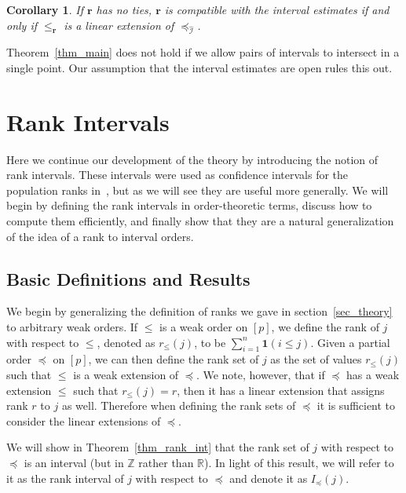\documentclass[12pt]{article}
\newcommand{\ind}[1]{\mathbf{1}(#1)}
\newcommand{\iord}{{\preceq_{\hat{\mathcal{I}}}}}
\newcommand{\rord}[1][\mathbf{r}]{{\leqslant_{#1}}}
\numberwithin{theorem}{section}
\newtheorem{corollary}[theorem]{Corollary}
\begin{document}
\begin{corollary}
\label{cor_main}
If $\mathbf{r}$ has no ties, $\mathbf{r}$ is compatible with the interval estimates if and only if $\rord$ is a linear extension of $\iord$.
\end{corollary}

Theorem~\ref{thm_main} does not hold if we allow pairs of intervals to intersect in a single point.  Our assumption that the interval estimates are open rules this out.

\section{Rank Intervals}
\label{sec_rank_int}

Here we continue our development of the theory by introducing the notion of rank intervals.  These intervals were used as confidence intervals for the population ranks in~\cite{klein2020jointCR}, but as we will see they are useful more generally.  We will begin by defining the rank intervals in order-theoretic terms, discuss how to compute them efficiently, and finally show that they are a natural generalization of the idea of a rank to interval orders.

\subsection{Basic Definitions and Results}

We begin by generalizing the definition of ranks we gave in section~\ref{sec_theory} to arbitrary weak orders.  If $\leqslant$ is a weak order on $[p]$, we define the rank of $j$ with respect to $\leqslant$, denoted as $r_\leqslant(j)$, to be $\sum_{i = 1}^n \ind{i \leqslant j}$.  Given a partial order $\preceq$ on $[p]$, we can then define the rank set of $j$ as the set of values $r_\leqslant(j)$ such that $\leqslant$ is a weak extension of $\preceq$.  We note, however, that if $\preceq$ has a weak extension $\leqslant$ such that $r_\leqslant(j) = r$, then it has a linear extension that assigns rank $r$ to $j$ as well.  Therefore when defining the rank sets of $\preceq$ it is sufficient to consider the linear extensions of $\preceq$.

We will show in Theorem~\ref{thm_rank_int} that the rank set of $j$ with respect to $\preceq$ is an interval (but in $\mathbb{Z}$ rather than $\mathbb{R}$).  In light of this result, we will refer to it as the rank interval of $j$ with respect to $\preceq$ and denote it as $I_\preceq(j)$.
\end{document}
